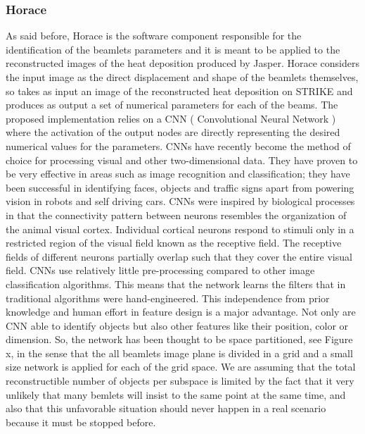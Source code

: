 \subsubsection{Horace}
As said before, Horace is the software component responsible for the identification of the beamlets parameters and it is meant to be applied to the reconstructed images of the heat deposition produced by Jasper. Horace considers the input image as the direct displacement and shape of the beamlets themselves, so takes as input an image of the reconstructed heat deposition on STRIKE and produces as output a set of numerical parameters for each of the beams.
The proposed implementation relies on a CNN ( Convolutional Neural Network ) where the activation of the output nodes are directly representing the desired numerical values for the parameters. 
CNNs have recently become the method of choice for processing visual and other two-dimensional data. They have proven to be very effective in areas such as image recognition and classification; they have been successful in identifying faces, objects and traffic signs apart from powering vision in robots and self driving cars.
CNNs were inspired by biological processes in that the connectivity pattern between neurons resembles the organization of the animal visual cortex. Individual cortical neurons respond to stimuli only in a restricted region of the visual field known as the receptive field. The receptive fields of different neurons partially overlap such that they cover the entire visual field.
CNNs use relatively little pre-processing compared to other image classification algorithms. This means that the network learns the filters that in traditional algorithms were hand-engineered. This independence from prior knowledge and human effort in feature design is a major advantage. 
Not only are CNN able to identify objects but also other features like their position, color or dimension. 
So, the network has been thought to be space partitioned, see Figure x, in the sense that the all beamlets image plane is divided in a grid and a small size network is applied for each of the grid space. We are assuming that the total reconstructible number of objects per subspace is limited by the fact that it very unlikely that many bemlets will insist to the same point at the same time, and also that this unfavorable situation should never happen in a real scenario because it must be stopped before. 
